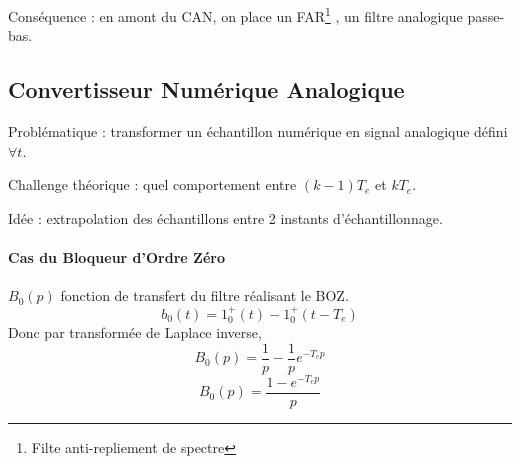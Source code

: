 \documentclass[main.tex]{subfiles}
\begin{document}
Conséquence : en amont du CAN, on place un FAR\footnote{Filte anti-repliement de spectre} , un filtre analogique passe-bas.

\subsection*{Convertisseur Numérique Analogique}

Problématique : transformer un échantillon numérique en signal analogique défini $\forall t$.

Challenge théorique : quel comportement entre $(k-1)T_e$ et $kT_e$.

Idée : extrapolation des échantillons entre 2 instants d'échantillonnage.

\paragraph{Cas du Bloqueur d'Ordre Zéro}

$B_0(p)$ fonction de transfert du filtre réalisant le BOZ.
\[b_0(t) = 1_0^+(t) - 1_0^+(t-T_e)\]
Donc par transformée de Laplace inverse,
\[B_0(p) = \frac{1}{p}-\frac{1}{p}e^{-T_ep} \]
\[ \boxed{B_0(p) = \frac{1-e^{-T_ep}}{p}} \]
\end{document}

